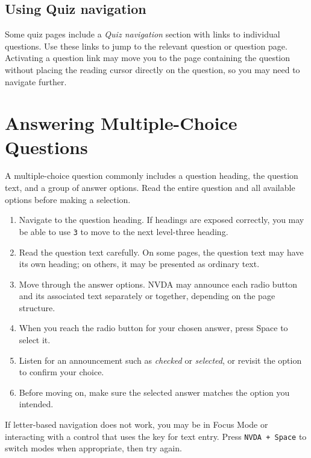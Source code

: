 \documentclass[11pt,oneside]{book}
\begin{document}
\section{Using Quiz navigation}
Some quiz pages include a \textit{Quiz navigation} section with links to individual questions. Use these links to jump to the relevant question or question page. Activating a question link may move you to the page containing the question without placing the reading cursor directly on the question, so you may need to navigate further.

\chapter{Answering Multiple-Choice Questions}
A multiple-choice question commonly includes a question heading, the question text, and a group of answer options. Read the entire question and all available options before making a selection.

\begin{enumerate}
	\item Navigate to the question heading. If headings are exposed correctly, you may be able to use \texttt{3} to move to the next level-three heading.
	\item Read the question text carefully. On some pages, the question text may have its own heading; on others, it may be presented as ordinary text.
	\item Move through the answer options. NVDA may announce each radio button and its associated text separately or together, depending on the page structure.
	\item When you reach the radio button for your chosen answer, press Space to select it.
	\item Listen for an announcement such as \textit{checked} or \textit{selected}, or revisit the option to confirm your choice.
	\item Before moving on, make sure the selected answer matches the option you intended.
\end{enumerate}
If letter-based navigation does not work, you may be in Focus Mode or interacting with a control that uses the key for text entry. Press \texttt{NVDA + Space} to switch modes when appropriate, then try again.
\end{document}
